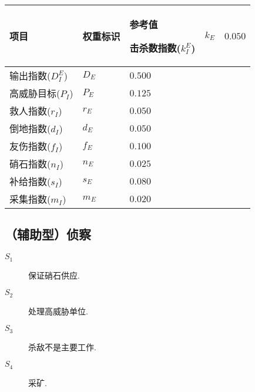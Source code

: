 \documentclass{ctexart}
\begin{document}
\begin{longtable}{|>{\centering\arraybackslash}p{8em}|>{\centering\arraybackslash}p{4em}|>{\centering\arraybackslash}p{6em}|}
    \hline

    项目             & 权重标识  & 参考值     \endhead

    \hline

    击杀数指数($k_I^E$) & $k_E$ & $0.050$          \\

    \hline

    输出指数($D_I^E$)  & $D_E$ & $0.500$          \\

    \hline

    高威胁目标($P_I$)   & $P_E$ & $0.125$          \\

    \hline

    救人指数($r_I$)    & $r_E$ & $0.050$          \\

    \hline

    倒地指数($d_I$)    & $d_E$ & $0.050$          \\

    \hline

    友伤指数($f_I$)    & $f_E$ & $0.100$          \\

    \hline

    硝石指数($n_I$)    & $n_E$ & $0.025$          \\

    \hline

    补给指数($s_I$)    & $s_E$ & $0.080$          \\

    \hline

    采集指数($m_I$)    & $m_E$ & $0.020$          \\

    \hline
\end{longtable}


\subsection{（辅助型）侦察}

\begin{description}
    \item[$S_1$] 保证硝石供应.\cite{bilibili-scout}\cite{tieba-scout}\cite{tieba-all}\cite{xiaoheihe-all}
    \item[$S_2$] 处理高威胁单位.\cite{bilibili-scout}\cite{tieba-scout}\cite{tieba-all}
    \item[$S_3$] 杀敌不是主要工作.\cite{tieba-scout}\cite{tieba-all}\cite{xiaoheihe-all}
    \item[$S_4$] 采矿.\cite{tieba-all}\cite{xiaoheihe-all}
\end{description}
\end{document}
